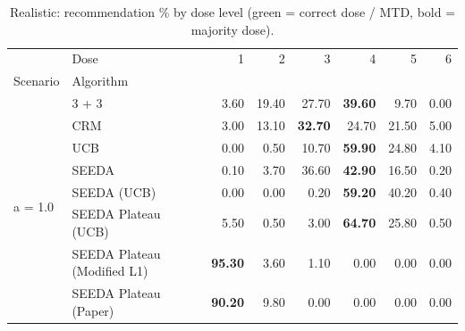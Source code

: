 \begin{table}[H]
\centering
\caption{Realistic: recommendation \% by dose level (green = correct dose / MTD, bold = majority dose).}
\label{tab:real_rec_by_dose}
\begin{tabular}{llrrrrrr}
\toprule
 & Dose & 1 & 2 & 3 & 4 & 5 & 6 \\
Scenario & Algorithm &  &  &  &  &  &  \\
\midrule
\multirow[c]{8}{*}{a = 1.0} & 3 + 3 & 3.60 & 19.40 & {\cellcolor[HTML]{C8E6C9}} 27.70 & \bfseries 39.60 & 9.70 & 0.00 \\
 & CRM & 3.00 & 13.10 & {\cellcolor[HTML]{C8E6C9}} \bfseries 32.70 & 24.70 & 21.50 & 5.00 \\
 & UCB & 0.00 & 0.50 & {\cellcolor[HTML]{C8E6C9}} 10.70 & \bfseries 59.90 & 24.80 & 4.10 \\
 & SEEDA & 0.10 & 3.70 & {\cellcolor[HTML]{C8E6C9}} 36.60 & \bfseries 42.90 & 16.50 & 0.20 \\
 & SEEDA (UCB) & 0.00 & 0.00 & {\cellcolor[HTML]{C8E6C9}} 0.20 & \bfseries 59.20 & 40.20 & 0.40 \\
 & SEEDA Plateau (UCB) & 5.50 & 0.50 & {\cellcolor[HTML]{C8E6C9}} 3.00 & \bfseries 64.70 & 25.80 & 0.50 \\
 & SEEDA Plateau (Modified L1) & \bfseries 95.30 & 3.60 & {\cellcolor[HTML]{C8E6C9}} 1.10 & 0.00 & 0.00 & 0.00 \\
 & SEEDA Plateau (Paper) & \bfseries 90.20 & 9.80 & {\cellcolor[HTML]{C8E6C9}} 0.00 & 0.00 & 0.00 & 0.00 \\
\bottomrule
\end{tabular}
\end{table}
